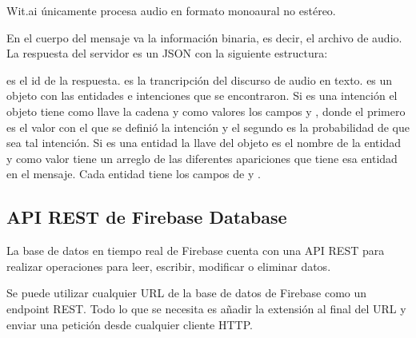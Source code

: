 Wit.ai únicamente procesa audio en formato monoaural no estéreo.

En el cuerpo del mensaje va la información binaria, es decir,
el archivo de audio. La respuesta del servidor
es un JSON con la siguiente estructura:

\begin{sphinxVerbatim}[commandchars=\\\{\}]
   
   
   
      \PYG{p}{[} 
       
       
     \PYG{p}{]}
     
       
       
\end{sphinxVerbatim}

 es el id de la respuesta.  es la trancripción
del discurso de audio en texto.  es un objeto con las
entidades e intenciones que se encontraron. Si es una intención
el objeto tiene como llave la cadena  y como
valores los campos  y , donde el primero
es el valor con el que se definió la intención y el segundo es la
probabilidad de que sea tal intención. Si es una
entidad la llave del objeto es el nombre de la entidad y como valor
tiene un arreglo de las diferentes apariciones que tiene
esa entidad en el mensaje. Cada entidad tiene los campos de
 y .


\subsection{API REST de Firebase Database}
\label{\detokenize{chapter_one/apis_rest:api-rest-de-firebase-database}}
La base de datos en tiempo real de Firebase cuenta con una API REST
para realizar operaciones para leer, escribir, modificar o eliminar datos.

Se puede utilizar cualquier URL de la base de datos de Firebase como un endpoint
REST. Todo lo que se necesita es añadir la extensión  al final del
URL y enviar una petición desde cualquier cliente HTTP.

